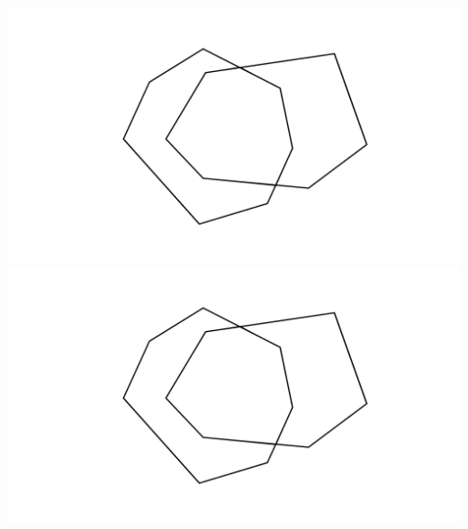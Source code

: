 \documentclass[a4paper,12pt]{article}
\begin{document}
\begin{center}
\vspace{35pt}
\includegraphics[width=0.375\linewidth]{../images/worksheet2b_no_color.pdf}\hspace{50pt}
\includegraphics[width=0.375\linewidth]{../images/worksheet2b_no_color.pdf}
\end{center}

\newpage
\end{document}
